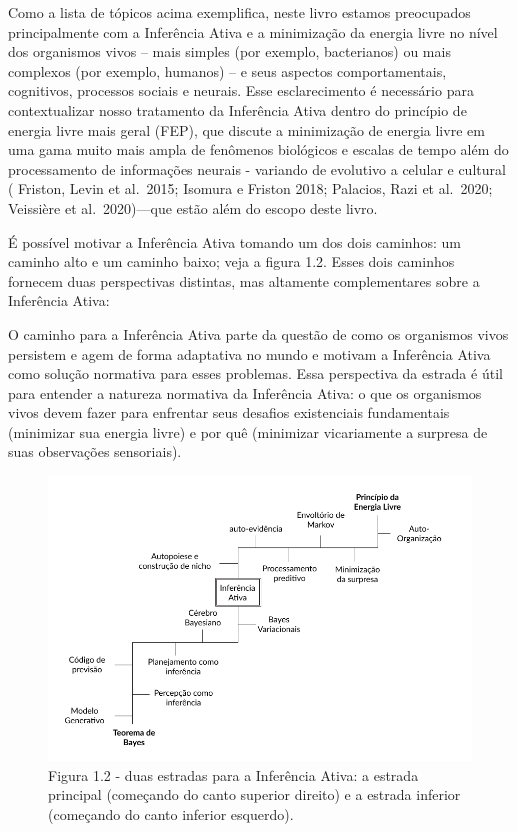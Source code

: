 \documentclass[
  12pt,
]{book}
\begin{document}
Como a lista de tópicos acima exemplifica, neste livro estamos preocupados principalmente com a Inferência Ativa e a minimização da energia livre no nível dos organismos vivos -- mais simples (por exemplo, bacterianos) ou mais complexos (por exemplo, humanos) -- e seus aspectos comportamentais, cognitivos, processos sociais e neurais. Esse esclarecimento é necessário para contextualizar nosso tratamento da Inferência Ativa dentro do princípio de energia livre mais geral (FEP), que discute a minimização de energia livre em uma gama muito mais ampla de fenômenos biológicos e escalas de tempo além do processamento de informações neurais - variando de evolutivo a celular e cultural ( Friston, Levin et al.~2015; Isomura e Friston 2018; Palacios, Razi et al.~2020; Veissière et al.~2020)---que estão além do escopo deste livro.

É possível motivar a Inferência Ativa tomando um dos dois caminhos: um caminho alto e um caminho baixo; veja a figura 1.2. Esses dois caminhos fornecem duas perspectivas distintas, mas altamente complementares sobre a Inferência Ativa:

O caminho para a Inferência Ativa parte da questão de como os organismos vivos persistem e agem de forma adaptativa no mundo e motivam a Inferência Ativa como solução normativa para esses problemas. Essa perspectiva da estrada é útil para entender a natureza normativa da Inferência Ativa: o que os organismos vivos devem fazer para enfrentar seus desafios existenciais fundamentais (minimizar sua energia livre) e por quê (minimizar vicariamente a surpresa de suas observações sensoriais).

\begin{figure}
\centering
\includegraphics{images/Figura_1_2.png}
\caption{Figura 1.2 - duas estradas para a Inferência Ativa: a estrada principal (começando do canto superior direito) e a estrada inferior (começando do canto inferior esquerdo).}
\end{figure}
\end{document}
